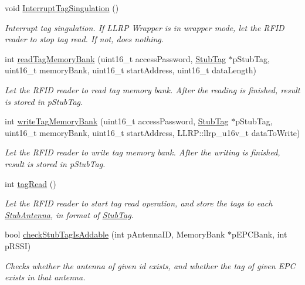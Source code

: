 \begin{DoxyCompactItemize}
void \hyperlink{class_e_l_f_i_n_1_1_stub_reader_aaced0c2169d09831e40f8a367a0f508f}{Interrupt\-Tag\-Singulation} ()
\begin{DoxyCompactList}\small\item\em Interrupt tag singulation. If L\-L\-R\-P Wrapper is in wrapper mode, let the R\-F\-I\-D reader to stop tag read. If not, does nothing. \end{DoxyCompactList}\item 
int \hyperlink{class_e_l_f_i_n_1_1_stub_reader_af8b6c25d5038e884799e9ee91ddf0f95}{read\-Tag\-Memory\-Bank} (uint16\-\_\-t access\-Password, \hyperlink{class_e_l_f_i_n_1_1_stub_tag}{Stub\-Tag} $\ast$p\-Stub\-Tag, uint16\-\_\-t memory\-Bank, uint16\-\_\-t start\-Address, uint16\-\_\-t data\-Length)
\begin{DoxyCompactList}\small\item\em Let the R\-F\-I\-D reader to read tag memory bank. After the reading is finished, result is stored in p\-Stub\-Tag. \end{DoxyCompactList}\item 
int \hyperlink{class_e_l_f_i_n_1_1_stub_reader_a620404b769bdc5d0ceb83f88a79bc122}{write\-Tag\-Memory\-Bank} (uint16\-\_\-t access\-Password, \hyperlink{class_e_l_f_i_n_1_1_stub_tag}{Stub\-Tag} $\ast$p\-Stub\-Tag, uint16\-\_\-t memory\-Bank, uint16\-\_\-t start\-Address, L\-L\-R\-P\-::llrp\-\_\-u16v\-\_\-t data\-To\-Write)
\begin{DoxyCompactList}\small\item\em Let the R\-F\-I\-D reader to write tag memory bank. After the writing is finished, result is stored in p\-Stub\-Tag. \end{DoxyCompactList}\item 
int \hyperlink{class_e_l_f_i_n_1_1_stub_reader_ad2da9e11a05b0d1970fd10617fd66643}{tag\-Read} ()
\begin{DoxyCompactList}\small\item\em Let the R\-F\-I\-D reader to start tag read operation, and store the tags to each \hyperlink{class_e_l_f_i_n_1_1_stub_antenna}{Stub\-Antenna}, in format of \hyperlink{class_e_l_f_i_n_1_1_stub_tag}{Stub\-Tag}. \end{DoxyCompactList}\item 
bool \hyperlink{class_e_l_f_i_n_1_1_stub_reader_a6e72ac9fba1db84e0d906f9eb0652d64}{check\-Stub\-Tag\-Is\-Addable} (int p\-Antenna\-I\-D, Memory\-Bank $\ast$p\-E\-P\-C\-Bank, int p\-R\-S\-S\-I)
\begin{DoxyCompactList}\small\item\em Checks whether the antenna of given id exists, and whether the tag of given E\-P\-C exists in that antenna. \end{DoxyCompactList}\item 

\end{DoxyCompactItemize}
